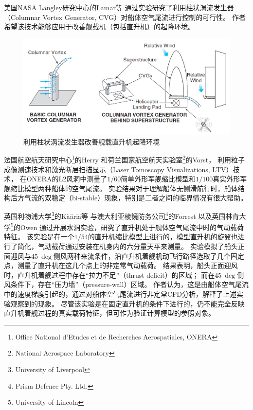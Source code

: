\documentclass[doctor,openright,twoside,color]{buaathesis}
\begin{document}
美国NASA Langley研究中心的Lamar等
通过实验研究了利用柱状涡流发生器（Columnar Vortex Generator, CVG）对船体空气尾流进行控制的可行性。
作者希望该技术能够应用于改善舰载机（包括直升机）的起降环境。
\begin{figure}[t!]
    \centering
    \includegraphics[height=0.3\textheight]{figures/modifying.png}
    \caption{利用柱状涡流发生器改善舰载直升机起降环境}
\end{figure}

法国航空航天研究中心\footnote{Office National d'Etudes et de Recherches Aerospatiales, ONERA}的Herry
和荷兰国家航空航天实验室\footnote{National Aerospace Laboratory}的Vorst，
利用粒子成像测速技术和激光断层扫描显示（Laser Tomoscopy Visualizations, LTV）技术，
在ONERA的L2风洞中测量了$1/60$简单外形军舰缩比模型和$1/100$真实外形军舰缩比模型两种船体的空气尾流。
实验结果对于理解船体无侧滑航行时，船体结构后方气流的双稳定（bi-stable）现象，特别是二者之间的临界情况有很大帮助。

英国利物浦大学\footnote{University of Liverpool}的Kääriä等
与澳大利亚棱镜防务公司\footnote{Prism Defence Pty. Ltd.}的Forrest
以及英国林肯大学\footnote{University of Lincoln}的Owen
通过开展水洞实验，研究了直升机处于舰体空气尾流中时的气动载荷特征。
该实验是在一个$1/54$的直升机缩比模型上进行的，模型直升机的旋翼也进行了简化，气动载荷通过安装在机身内的六分量天平来测量。
实验模拟了船头正面迎风与$45~\deg$侧风两种来流条件，沿直升机着舰机动飞行路径选取了几个固定点，测量了直升机在这几个点上的非定常气动载荷。
结果表明，船头正面迎风时，直升机着舰过程中存在“拉力不足”（thrust-deficit）的区域；
而在$45~\deg$侧风条件下，存在“压力墙”（pressure-wall）区域。
作者认为，这是由船体空气尾流中的速度梯度引起的，通过对船体空气尾流进行非定常CFD分析，解释了上述实验观察到的现象。
尽管该实验是在固定直升机的条件下进行的，仍不能完全反映直升机着舰过程的真实载荷特征，但可作为验证计算模型的参照对象。
\end{document}
